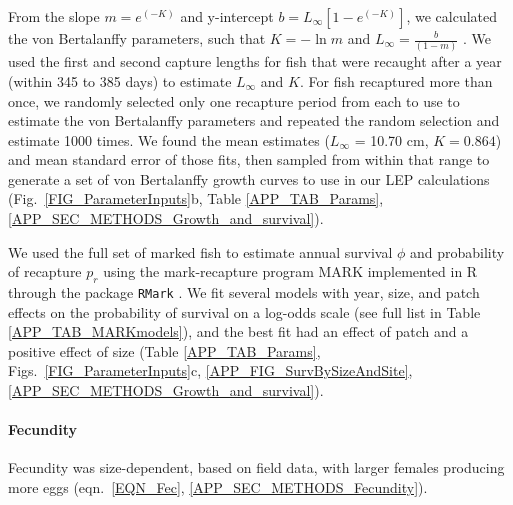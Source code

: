 \documentclass[12pt, oneside]{article}   	%
\begin{document}
From the slope $m = e^{(-K)}$ and y-intercept $b = L_\infty[1 - e^{(-K)}]$, we calculated the von Bertalanffy parameters, such that $K = -\ln m$ and $L_\infty = \frac{b}{(1-m)}$ \citep{hart2009estimating}. We used the first and second capture lengths for fish that were recaught after a year (within 345 to 385 days) to estimate $L_\infty$ and $K$. For fish recaptured more than once, we randomly selected only one recapture period from each to use to estimate the von Bertalanffy parameters and repeated the random selection and estimate 1000 times. We found the mean estimates ($L_\infty$ = 10.70 cm, $K = 0.864$) and mean standard error of those fits, then sampled from within that range to generate a set of von Bertalanffy growth curves to use in our LEP calculations (Fig.\ \ref{FIG_ParameterInputs}b, Table \ref{APP_TAB_Params}, \ref{APP_SEC_METHODS_Growth_and_survival}). 

We used the full set of marked fish to estimate annual survival $\phi$ and probability of recapture $p_r$ using the mark-recapture program MARK implemented in R through the package \texttt{RMark} \citep{RMark_Laake2013}. We fit several models with year, size, and patch effects on the probability of survival on a log-odds scale (see full list in Table \ref{APP_TAB_MARKmodels}), and the best fit had an effect of patch and a positive effect of size (Table \ref{APP_TAB_Params}, Figs.\ \ref{FIG_ParameterInputs}c, \ref{APP_FIG_SurvBySizeAndSite}, \ref{APP_SEC_METHODS_Growth_and_survival}). 

\paragraph*{Fecundity}

Fecundity was size-dependent, based on field data, with larger females producing more eggs (eqn.\ \ref{EQN_Fec}, \ref{APP_SEC_METHODS_Fecundity}).

\end{document}
